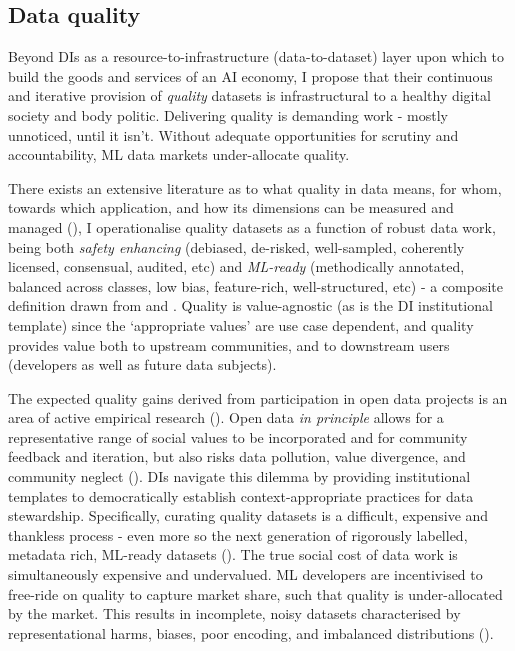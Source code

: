 \subsection*{Data quality}

Beyond DIs as a  resource-to-infrastructure (data-to-dataset) layer upon which to build the goods and services of an AI economy, I propose that their continuous and iterative provision of \textit{quality} datasets is infrastructural to a healthy digital society and body politic. Delivering quality is demanding work - mostly unnoticed, until it isn't. Without adequate opportunities for scrutiny and accountability, ML data markets under-allocate quality.

There exists an extensive literature as to what quality in data means, for whom, towards which application, and how its dimensions can be measured and managed (\cite{gudivada2017DataQualityConsiderationsa, munappy2022DataManagementProduction, sambasivan2021EveryoneWantsModel, kreutzer2022QualityGlanceAudit}), I operationalise quality datasets as a function of robust data work, being both \textit{safety enhancing} (debiased, de-risked, well-sampled, coherently licensed, consensual, audited, etc) and \textit{ML-ready} (methodically annotated, balanced across classes, low bias, feature-rich, well-structured, etc) - a composite definition drawn from \textcite{paullada2021DataItsDis} and \textcite{gudivada2017DataQualityConsiderationsa}. Quality is value-agnostic (as is the DI institutional template) since the `appropriate values' are use case dependent, and quality provides value both to upstream communities, and to downstream users (developers as well as future data subjects).

The expected quality gains derived from participation in open data projects is an area of active empirical research (\cite{criado2019CreatingPublicValue, 2023ExploringValueDecentralised, 2021EconomicImpactTrust, }). Open data \textit{in principle} allows for a representative range of social values to be incorporated and for community feedback and iteration, but also risks data pollution, value divergence, and community neglect (\cite{2022MeasuringImpactData}). DIs navigate this dilemma by providing institutional templates to democratically establish context-appropriate practices for data stewardship. Specifically, curating quality datasets is a difficult, expensive and thankless process - even more so the next generation of rigorously labelled, metadata rich, ML-ready datasets (\cite{oala2023DMLRDatacentricMachine}). The true social cost of data work is simultaneously expensive and undervalued. ML developers are incentivised to free-ride on quality to capture market share, such that quality is under-allocated by the market. This results in incomplete, noisy datasets characterised by representational harms, biases, poor encoding, and imbalanced distributions (\cite{gudivada2017DataQualityConsiderationsa}). 

